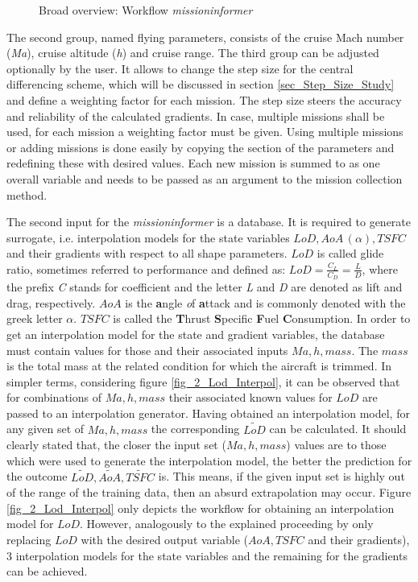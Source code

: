 \begin{figure}[!h]
    \def\svgwidth{\linewidth}
    
    \caption{Broad overview: Workflow \emph{missioninformer}}
    \label{fig_1_Missinfo}
\end{figure}

\FloatBarrier
The second group, named flying parameters, consists of the 
cruise Mach number (\emph{Ma}), 
cruise altitude (\emph{h}) and cruise range. The third group can be 
adjusted optionally by the user. It allows to change the step size 
for the central differencing scheme, which will be discussed 
in section \ref{sec_Step_Size_Study} and define 
a weighting factor for each mission. The step size steers the accuracy 
and reliability of the calculated gradients. In case, multiple missions 
shall be used, for each mission a weighting factor must be 
given. Using multiple missions or adding missions is done easily by  
copying the section of the parameters and
redefining these with desired values. Each new mission is 
summed to as one overall variable and needs to be passed 
as an argument to the mission collection 
method. \newline

The second input for the \emph{missioninformer} is a database. It is required 
to generate surrogate, i.e. interpolation models for the state variables 
$LoD, AoA \,(\alpha), TSFC$ and their gradients with respect to all 
shape parameters. $LoD$ is called glide ratio, sometimes referred to 
performance and defined as: $LoD = \frac{C_L}{C_D} = \frac{L}{D}$, where 
the prefix \emph{C} stands for coefficient and the letter \emph{L} and \emph{D} 
are denoted as lift and drag, respectively. $AoA$ is the \textbf{a}ngle 
\emph{o}f \textbf{a}ttack 
and is commonly denoted with the greek letter $\alpha$. $TSFC$ is 
called the \textbf{T}hrust \textbf{S}pecific \textbf{F}uel \textbf{C}onsumption.
In order to get an interpolation model for the state and gradient variables, 
the database must contain values for those and their associated inputs
$Ma, h, mass$. The $mass$ is the total mass at the related condition
for which the aircraft is trimmed.
In simpler terms, considering figure \ref{fig_2_Lod_Interpol},
it can be observed that for combinations of $Ma, h, mass$ 
their associated known values for $LoD$ are passed to an interpolation generator. 
Having obtained an interpolation model, for any given set of 
$Ma, h, mass$ the corresponding $\tilde{LoD}$ can be calculated. It should 
clearly stated that, the closer the input set ($Ma, h, mass$) 
values are to those which were used to generate the interpolation model,
the better the prediction for the outcome $\tilde{LoD},
\tilde{AoA}, \tilde{TSFC}$ is. This means, if 
the given input set is highly out of the range of the training data, 
then an absurd extrapolation may occur. Figure \ref{fig_2_Lod_Interpol} 
only depicts the workflow for obtaining an interpolation model for 
$LoD$. However, analogously to the explained proceeding by only 
replacing $LoD$ with the desired output variable ($AoA, TSFC$ and their 
gradients), 3 interpolation models for the state variables and the
remaining for the gradients can be achieved. \newline 

